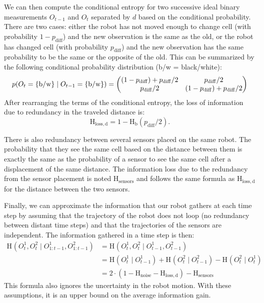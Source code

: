 \documentclass{svmult}
\newcommand{\ent}[1]{\mathrm{H}_\mathrm{#1}} %
\begin{document}
We can then compute the conditional entropy for two successive ideal binary measurements $O_{t-1}$ and $O_t$ separated by $d$ based on the conditional probability.
There are two cases: either the robot has not moved enough to change cell (with probability $1 - p_\mathrm{diff}$) and the new observation is the same as the old, or the robot has changed cell (with probability $p_\mathrm{diff}$) and the new observation has the same probability to be the same or the opposite of the old.
This can be summarized by the following conditional probability distribution ({b/w} = {black/white}):
\begin{equation}
	p(O_t=\{\mathrm{b}/\mathrm{w}\} \mid O_{t-1}=\{\mathrm{b}/\mathrm{w}\})\\
	= \begin{pmatrix}
		(1 - p_\mathrm{diff}) + p_\mathrm{diff}/2 & p_\mathrm{diff}/2\\
		p_\mathrm{diff}/2 & (1 - p_\mathrm{diff}) + p_\mathrm{diff}/2
	\end{pmatrix}
\end{equation}
After rearranging the terms of the conditional entropy, the loss of information due to redundancy in the traveled distance is:
\begin{equation}
	\ent{loss,d} = 1 - \ent{b}(p_\mathrm{diff}/2).
\end{equation}

There is also redundancy between several sensors placed on the same robot.
The probability that they see the same cell based on the distance between them is exactly the same as the probability of a sensor to see the same cell after a displacement of the same distance.
The information loss due to the redundancy from the sensor placement is noted $\ent{sensors}$ and follows the same formula as $\ent{loss,d}$ for the distance between the two sensors.

Finally, we can approximate the information that our robot gathers at each time step by assuming that the trajectory of the robot does not loop (no redundancy between distant time steps) and that the trajectories of the sensors are independent. 
The information gathered in a time step is then:
\begin{equation}
\begin{split}
	\ent{}(O^1_t, O^2_t \mid O^1_{1:t-1}, O^2_{1:t-1}) &= \ent{}(O^1_t, O^2_t \mid O^1_{t-1}, O^2_{t-1}) \\
	&= \ent{}(O^1_t \mid O^1_{t-1}) + \ent{}(O^2_t \mid O^2_{t-1}) - \ent{}(O^2_t \mid O^1_t) \\
	&= 2\cdot(1-\ent{noise}-\ent{loss,d}) - \ent{sensors}%
\end{split}
\end{equation}
This formula also ignores the uncertainty in the robot motion.
With these assumptions, it is an upper bound on the average information gain.
\end{document}
